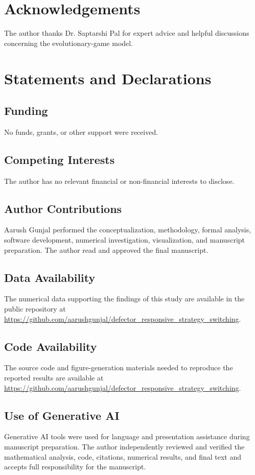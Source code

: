 \documentclass[pdflatex,sn-mathphys-ay]{sn-jnl}
\theoremstyle{thmstyleone}
\begin{document}
\backmatter

\section*{Acknowledgements}

The author thanks Dr. Saptarshi Pal for expert advice and helpful discussions concerning the evolutionary-game model.

\section*{Statements and Declarations}

\subsection*{Funding}

No funds, grants, or other support were received.

\subsection*{Competing Interests}

The author has no relevant financial or non-financial interests to disclose.

\subsection*{Author Contributions}

Aarush Gunjal performed the conceptualization, methodology, formal analysis, software development, numerical investigation, visualization, and manuscript preparation. The author read and approved the final manuscript.

\subsection*{Data Availability}

The numerical data supporting the findings of this study are available in the public repository at \url{https://github.com/aarushgunjal/defector_responsive_strategy_switching}.

\subsection*{Code Availability}

The source code and figure-generation materials needed to reproduce the reported results are available at \url{https://github.com/aarushgunjal/defector_responsive_strategy_switching}.

\subsection*{Use of Generative AI}

Generative AI tools were used for language and presentation assistance during manuscript preparation. The author independently reviewed and verified the mathematical analysis, code, citations, numerical results, and final text and accepts full responsibility for the manuscript.


\end{document}
